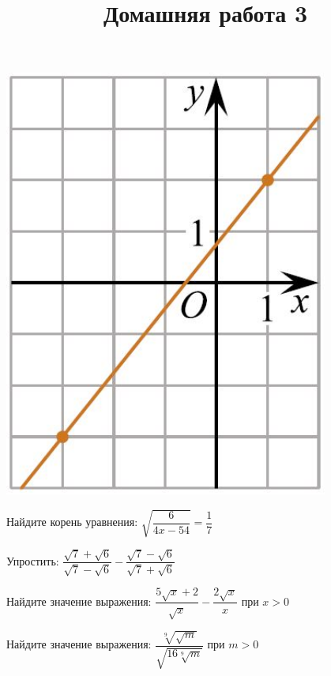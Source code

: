 \begin{homework}[number=2]
\begin{listofex}
\begin{minipage}[c]{0.2\textwidth}
		\includegraphics[align=t, width=0.8\textwidth]{pics/G112M3C2-1}
	\end{minipage}
	\item Найдите корень уравнения:
	\( \sqrt{\dfrac{6}{4x-54}}=\dfrac{1}{7} \)
	\item Упростить:
	\( \dfrac{\sqrt{7}+\sqrt{6}}{\sqrt{7}-\sqrt{6}}-\dfrac{\sqrt{7}-\sqrt{6}}{\sqrt{7}+\sqrt{6}} \)
	\item Найдите значение выражения:
	\( \dfrac{5\sqrt{x}+2}{\sqrt{x}}-\dfrac{2\sqrt{x}}{x} \) при \( x>0 \)
	\item Найдите значение выражения:
	\( \dfrac{\sqrt[9]{\sqrt{m}}}{\sqrt{16\sqrt[9]{m}}} \) при \( m>0 \)
\end{listofex}
\end{homework}
%	
%	
\newpage
\title{Домашняя работа 3}
